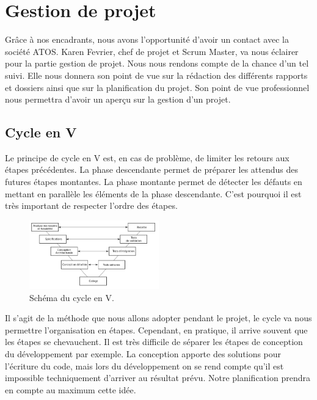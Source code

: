 \documentclass[a4paper]{article}
\begin{document}
\section{Gestion de projet}
\label{sec:gestion_projet}

Gr\^ace \`a nos encadrants, nous avons l'opportunit\'e d'avoir un contact avec la soci\'et\'e ATOS. Karen Fevrier, chef de projet et Scrum Master, va nous \'eclairer pour la partie gestion de projet. Nous nous rendons compte de la chance d'un tel suivi. Elle nous donnera son point de vue sur la r\'edaction des diff\'erents rapports et dossiers ainsi que sur la planification du projet. Son point de vue professionnel nous permettra d'avoir un aper\c{c}u sur la gestion d'un projet.

\subsection{Cycle en V}
\label{subsec:cycleenv}

	Le principe de cycle en V est, en cas de probl\`eme, de limiter les retours aux \'etapes pr\'ec\'edentes. La phase descendante permet de pr\'eparer les attendus des futures \'etapes montantes. La phase montante permet de d\'etecter les d\'efauts en mettant en parall\`ele les \'el\'ements de la phase descendante. C'est pourquoi il est tr\`es important de respecter l'ordre des \'etapes.

\begin{figure}[H]
\centering
\includegraphics[width=0.5\textwidth]{organisation_cycle_en_v.png}
\caption{\label{fig:cycle_en_v}Sch\'ema du cycle en V.}
\end{figure}

	Il s'agit de la m\'ethode que nous allons adopter pendant le projet, le cycle va nous permettre l'organisation en \'etapes. Cependant, en pratique, il arrive souvent que les \'etapes se chevauchent. Il est tr\`es difficile de s\'eparer les \'etapes de conception du d\'eveloppement par exemple. La conception apporte des solutions pour l'\'ecriture du code, mais lors du d\'eveloppement on se rend compte qu'il est impossible techniquement d'arriver au r\'esultat pr\'evu. Notre planification prendra en compte au maximum cette id\'ee.	
\end{document}

